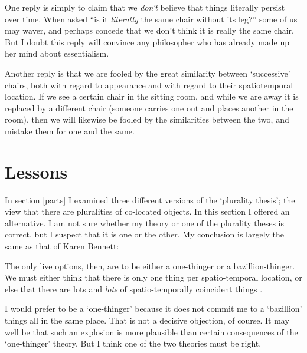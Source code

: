 \documentclass[11pt]{article}
\newenvironment{squote}{%
\begin{spacing}{1}
\begin{list}{}{%
\setlength{\labelwidth}{0pt}%
\rightmargin\leftmargin%
}
\item\relax
}{%
\end{list}%
\end{spacing}
}
\begin{document}
\begin{spacing}{1.5}
One reply is simply to claim that we {\em don't} believe that things
literally persist over time.  When asked ``is it {\em literally} the
same chair without its leg?'' some of us may waver, and perhaps
concede that we don't think it is really the same chair.  But I doubt
this reply will convince any philosopher who has already made up her
mind about essentialism.

Another reply is that we are fooled by the great similarity between
`successive' chairs, both with regard to appearance and with regard to
their spatiotemporal location.  If we see a certain chair in the
sitting room, and while we are away it is replaced by a different
chair (someone carries one out and places another in the room), then
we will likewise be fooled by the similarities between the two, and
mistake them for one and the same.


\section{Lessons}
\label{lessons-e}
In section \ref{parts} I examined three different versions of the
`plurality thesis'; the view that there are pluralities of co-located
objects.  In this section I offered an alternative.  I am not sure
whether my theory or one of the plurality theses is correct, but I
suspect that it is one or the other.  My conclusion is largely the
same as that of Karen Bennett:

\begin{squote}
The only live options, then, are to be either a one-thinger or a
bazillion-thinger.  We must either think that there is only one thing per
spatio-temporal location, or else that there are lots and \emph{lots} of
spatio-temporally coincident things \citeyearpar[358]{bennett2004}.
\end{squote}

I would prefer to be a `one-thinger' because it does not commit me to
a `bazillion' things all in the same place.  That is not a decisive
objection, of course.  It may well be that such an explosion is more
plausible than certain consequences of the `one-thinger' theory.  But
I think one of the two theories must be right.


\end{spacing}
\end{document}
